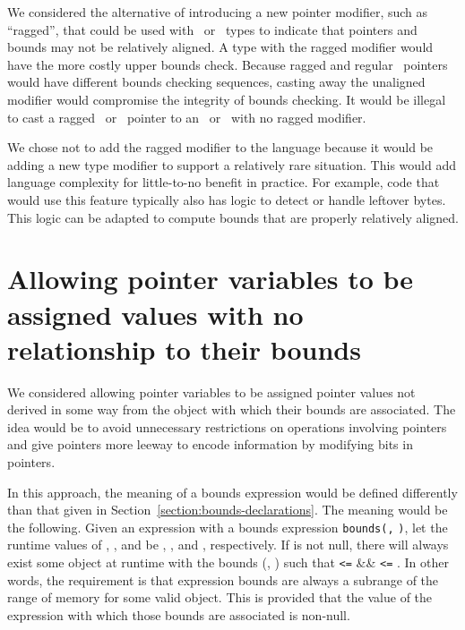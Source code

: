 We considered the alternative of introducing a new pointer modifier,
such as ``ragged'', that could be used with \arrayptr\
or \arrayview\ types to indicate that pointers and bounds may
not be relatively aligned. A type with the ragged modifier would have
the more costly upper bounds check. Because ragged and regular
\arrayptr\ pointers would have different bounds checking
sequences, casting away the unaligned modifier would compromise the
integrity of bounds checking. It would be illegal to cast a ragged
\arrayptr\ or \arrayview\ pointer to an
\arrayptr\ or \arrayview\ with no ragged modifier.

We chose not to add the ragged modifier to the language because it would
be adding a new type modifier to support a relatively rare situation.
This would add language complexity for little-to-no benefit in practice.
For example, code that would use this feature typically also has logic
to detect or handle leftover bytes. This logic can be adapted to compute
bounds that are properly relatively aligned.

\section{Allowing pointer variables to be assigned values with no relationship to their bounds}\label{allowing-pointer-variables-to-be-assigned-values-with-no-relationship-to-their-bounds}

We considered allowing pointer variables to be assigned pointer values
not derived in some way from the object with which their bounds are
associated. The idea would be to avoid unnecessary restrictions on
operations involving pointers and give pointers more leeway to encode
information by modifying bits in pointers.

In this approach, the meaning of a bounds expression would be defined
differently than that given in Section~\ref{section:bounds-declarations}. 
The meaning would be the
following. Given an expression  with a bounds expression
\texttt{bounds(}\texttt{,} \texttt{)}, let the runtime
values of \var{e}, \var{lb}, and \var{ub} be , \var{lbv},
and \var{ubv}, respectively. If \var{ev} is not null, there will
always exist some object at runtime with the bounds (,
) such that \var{low} \texttt{\textless{}=}  \&\&
\var{ubv} \texttt{\textless{}=} \var{high}. In other words, the
requirement is that expression bounds are always a subrange of the range
of memory for some valid object. This is provided that the value of the
expression with which those bounds are associated is non-null.

